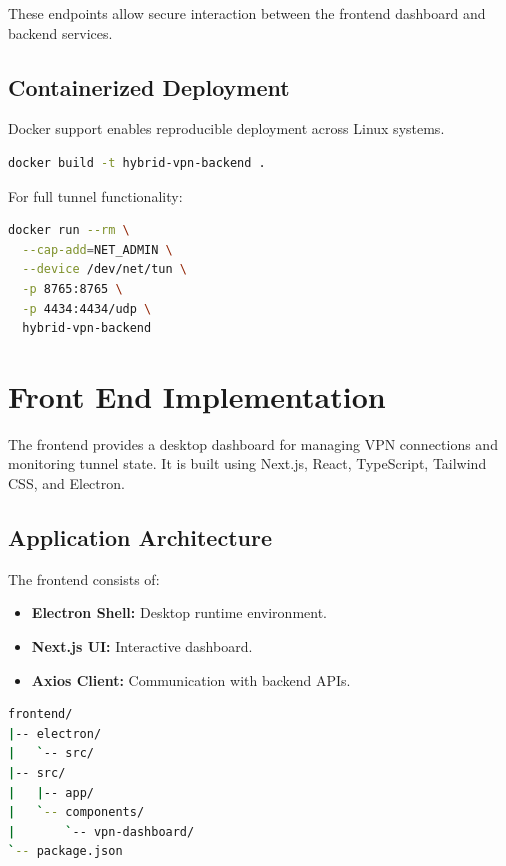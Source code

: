 These endpoints allow secure interaction between the frontend dashboard and backend services.

\subsection{Containerized Deployment}
\label{subsec:docker_deployment}

Docker support enables reproducible deployment across Linux systems.

\begin{lstlisting}[language=bash, caption={Backend Docker Build}]
docker build -t hybrid-vpn-backend .
\end{lstlisting}

For full tunnel functionality:

\begin{lstlisting}[language=bash, caption={Docker Run with TUN Access}]
docker run --rm \
  --cap-add=NET_ADMIN \
  --device /dev/net/tun \
  -p 8765:8765 \
  -p 4434:4434/udp \
  hybrid-vpn-backend
\end{lstlisting}

\section{Front End Implementation}
\label{sec:frontend_implementation}

The frontend provides a desktop dashboard for managing VPN connections and monitoring tunnel state. It is built using Next.js, React, TypeScript, Tailwind CSS, and Electron.

\subsection{Application Architecture}
\label{subsec:frontend_architecture}

The frontend consists of:

\begin{itemize}
    \item \textbf{Electron Shell:} Desktop runtime environment.
    \item \textbf{Next.js UI:} Interactive dashboard.
    \item \textbf{Axios Client:} Communication with backend APIs.
\end{itemize}

\begin{lstlisting}[language=bash, caption={Frontend Project Structure}]
frontend/
|-- electron/
|   `-- src/
|-- src/
|   |-- app/
|   `-- components/
|       `-- vpn-dashboard/
`-- package.json
\end{lstlisting}

